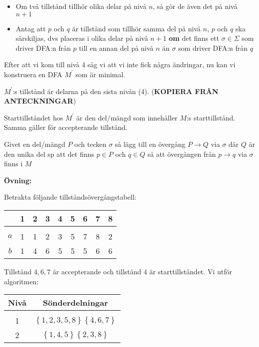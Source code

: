 \begin{itemize}
  \item Om två tillstånd tillhör olika delar på nivå $n$, så gör de även det på nivå $n+1$
  \item Antag att $p$ och $q$ är tillstånd som tillhör samma del på nivå $n$, $p$ och $q$ ska särskiljas, dvs placeras i olika delar på nivå $n+1$ \textbf{om} det finns ett $\sigma\in\Sigma$ som driver DFA:n från $p$ till en annan del på nivå $n$ än $\sigma$ som driver DFA:n från $q$ 
\end{itemize}
\par\bigskip
\noindent Efter att vi kom till nivå 4 såg vi att vi inte fick några ändringar, nu kan vi konstruera en DFA $M^{\prime}$ som är minimal.\par
\noindent $M^{\prime}$:s tillstånd är delarna på den sista nivån (4). (\textbf{KOPIERA FRÅN ANTECKNINGAR})\par
\noindent Starttillståndet hos $M^{\prime}$ är den del/mängd som innehåller $M$:s starttillstånd. Samma gäller för accepterande tillstånd.\par
\noindent Givet en del/mängd $P$ och tecken $\sigma$ så lägg till en övergång $P\to Q$ via $\sigma$ där $Q$ är den unika del sp att det finns $p\in P$ och $q\in Q$ så att övergången från $p\to q$ via $\sigma$ finns i $M$ 
\par\bigskip
\noindent\textbf{Övning:}\par
\noindent Betrakta följande tillståndsövergångstabell:
\par\bigskip
\begin{center}
  \begin{tabular}{c|c|c|c|c|c|c|c|c|}
    &1&2&3&4&5&6&7&8\\
    \hline\\
    $a$&1&1&2&3&5&7&8&2\\
    $b$&1&4&6&5&5&5&6&6
  \end{tabular}
\end{center}
\par\bigskip
\noindent Tillstånd $4,6,7$ är accepterande och tillstånd $4$ är starttillståndet. Vi utför algoritmen:
\par\bigskip
\begin{center}
  \begin{tabular}{c|c}
    Nivå&Sönderdelningar\\
    \hline\\
  1&$\left\{1,2,3,5,8\right\}\left\{4,6,7\right\}$\\
  2&$\left\{1,4,5\right\}\left\{2,3,8\right\}$
  \end{tabular}
\end{center}
